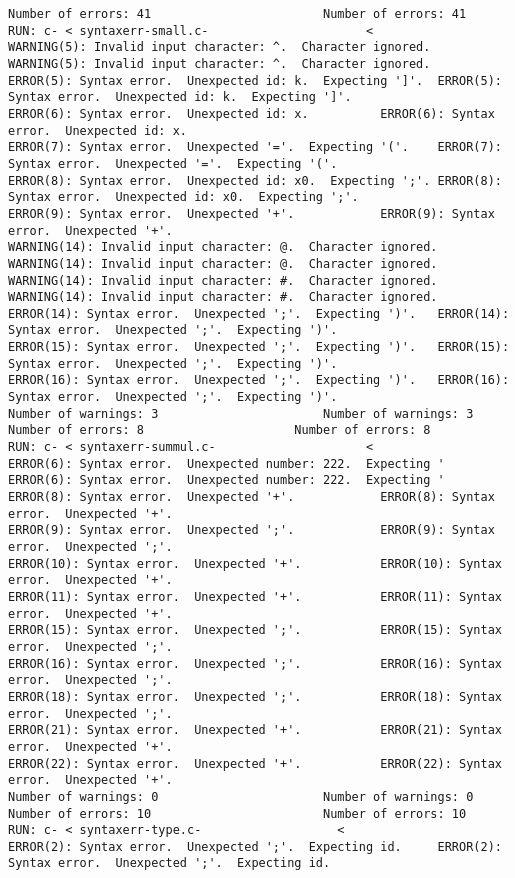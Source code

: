 \documentclass[12pt]{book}
\begin{document}
\begin{lstlisting}
Number of errors: 41						Number of errors: 41
RUN: c- < syntaxerr-small.c-				      <
WARNING(5): Invalid input character: ^.  Character ignored.	WARNING(5): Invalid input character: ^.  Character ignored.
ERROR(5): Syntax error.  Unexpected id: k.  Expecting ']'.	ERROR(5): Syntax error.  Unexpected id: k.  Expecting ']'.
ERROR(6): Syntax error.  Unexpected id: x.			ERROR(6): Syntax error.  Unexpected id: x.
ERROR(7): Syntax error.  Unexpected '='.  Expecting '('.	ERROR(7): Syntax error.  Unexpected '='.  Expecting '('.
ERROR(8): Syntax error.  Unexpected id: x0.  Expecting ';'.	ERROR(8): Syntax error.  Unexpected id: x0.  Expecting ';'.
ERROR(9): Syntax error.  Unexpected '+'.			ERROR(9): Syntax error.  Unexpected '+'.
WARNING(14): Invalid input character: @.  Character ignored.	WARNING(14): Invalid input character: @.  Character ignored.
WARNING(14): Invalid input character: #.  Character ignored.	WARNING(14): Invalid input character: #.  Character ignored.
ERROR(14): Syntax error.  Unexpected ';'.  Expecting ')'.	ERROR(14): Syntax error.  Unexpected ';'.  Expecting ')'.
ERROR(15): Syntax error.  Unexpected ';'.  Expecting ')'.	ERROR(15): Syntax error.  Unexpected ';'.  Expecting ')'.
ERROR(16): Syntax error.  Unexpected ';'.  Expecting ')'.	ERROR(16): Syntax error.  Unexpected ';'.  Expecting ')'.
Number of warnings: 3						Number of warnings: 3
Number of errors: 8						Number of errors: 8
RUN: c- < syntaxerr-summul.c-				      <
ERROR(6): Syntax error.  Unexpected number: 222.  Expecting '	ERROR(6): Syntax error.  Unexpected number: 222.  Expecting '
ERROR(8): Syntax error.  Unexpected '+'.			ERROR(8): Syntax error.  Unexpected '+'.
ERROR(9): Syntax error.  Unexpected ';'.			ERROR(9): Syntax error.  Unexpected ';'.
ERROR(10): Syntax error.  Unexpected '+'.			ERROR(10): Syntax error.  Unexpected '+'.
ERROR(11): Syntax error.  Unexpected '+'.			ERROR(11): Syntax error.  Unexpected '+'.
ERROR(15): Syntax error.  Unexpected ';'.			ERROR(15): Syntax error.  Unexpected ';'.
ERROR(16): Syntax error.  Unexpected ';'.			ERROR(16): Syntax error.  Unexpected ';'.
ERROR(18): Syntax error.  Unexpected ';'.			ERROR(18): Syntax error.  Unexpected ';'.
ERROR(21): Syntax error.  Unexpected '+'.			ERROR(21): Syntax error.  Unexpected '+'.
ERROR(22): Syntax error.  Unexpected '+'.			ERROR(22): Syntax error.  Unexpected '+'.
Number of warnings: 0						Number of warnings: 0
Number of errors: 10						Number of errors: 10
RUN: c- < syntaxerr-type.c-				      <
ERROR(2): Syntax error.  Unexpected ';'.  Expecting id.		ERROR(2): Syntax error.  Unexpected ';'.  Expecting id.

\end{lstlisting}
\end{document}
